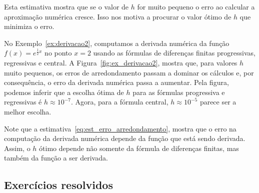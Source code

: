Esta estimativa mostra que se o valor de $h$ for muito pequeno o erro ao calcular a aproximação numérica cresce. Isso nos motiva a procurar o valor ótimo de $h$ que minimiza o erro.

\begin{ex}
No Exemplo~\ref{ex:derivacao2}, computamos a derivada numérica da função $f(x)=e^{\frac{1}{2}x}$ no ponto $x=2$ usando as fórmulas de diferenças finitas progressivas, regressivas e central. A Figura~\ref{fig:ex_derivacao2}, mostra que, para valores $h$ muito pequenos, os erros de arredondamento passam a dominar os cálculos e, por consequência, o erro da derivada numérica passa a aumentar. Pela figura, podemos inferir que a escolha ótima de $h$ para as fórmulas progressiva e regressivas é $h\approx 10^{-7}$. Agora, para a fórmula central, $h\approx 10^{-5}$ parece ser a melhor escolha.
\end{ex}

\begin{obs}
  Note que a estimativa~\eqref{eq:est_erro_arredondamento}, mostra que o erro na computação da derivada numérica depende da função que está sendo derivada. Assim, o $h$ ótimo depende não somente da fórmula de diferenças finitas, mas também da função a ser derivada.
\end{obs}

\subsection*{Exercícios resolvidos}

\construirExeresol

